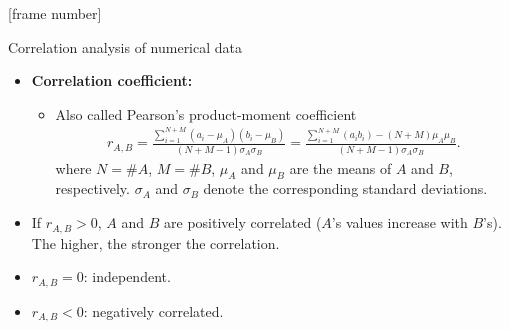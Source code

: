 \documentclass[aspectratio=169,t]{beamer}
\begin{document}
  {
    [frame number]
    \begin{frame}{Correlation analysis of numerical data}
    \begin{itemize}
      \item \textbf{\color{airforceblue}Correlation coefficient:}
      \begin{itemize}
        \item Also called Pearson's product-moment coefficient
        \begin{align}
          r_{A,B} = \frac{\sum_{i=1}^{N + M} (a_i-\mu_A)(b_i-\mu_B)}{(N+M-1)\sigma_A\sigma_B} = \frac{\sum_{i=1}^{N+M}(a_ib_i)-(N+M)\mu_A\mu_B}{(N+M-1) \sigma_A\sigma_B}.
        \end{align}
        where $N = \# A$, $M = \# B$, $\mu_A$ and $\mu_B$ are the means of $A$ and $B$, respectively. $\sigma_A$ and $\sigma_B$ denote the corresponding standard deviations.
      \end{itemize}
      \item If $r_{A,B} > 0$, $A$ and $B$ are positively correlated ($A$'s values increase with $B$'s). \\
      The higher, the stronger the correlation.
      \item $r_{A,B} = 0$: independent.
      \item $r_{A,B} < 0$: negatively correlated.
    \end{itemize}
    \end{frame}
  }
\end{document}
